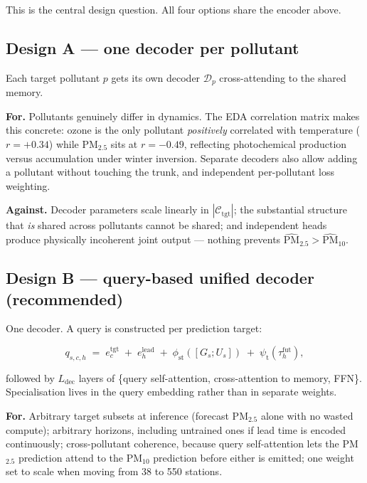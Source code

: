 \documentclass[11pt,a4paper]{article}
\newcommand{\Cset}{\mathcal{C}}
\begin{document}
This is the central design question. All four options share the encoder above.

\subsection{Design A --- one decoder per pollutant}

Each target pollutant $p$ gets its own decoder $\mathcal{D}_p$ cross-attending to
the shared memory.

\textbf{For.} Pollutants genuinely differ in dynamics. The EDA correlation matrix
makes this concrete: ozone is the only pollutant \emph{positively} correlated
with temperature ($r=+0.34$) while PM$_{2.5}$ sits at $r=-0.49$, reflecting
photochemical production versus accumulation under winter inversion. Separate
decoders also allow adding a pollutant without touching the trunk, and
independent per-pollutant loss weighting.

\textbf{Against.} Decoder parameters scale linearly in $|\Cset_{\text{tgt}}|$; the
substantial structure that \emph{is} shared across pollutants cannot be shared;
and independent heads produce physically incoherent joint output --- nothing
prevents $\widehat{\text{PM}}_{2.5} > \widehat{\text{PM}}_{10}$.

\subsection{Design B --- query-based unified decoder (recommended)}

One decoder. A query is constructed per prediction target:

\begin{equation}
q_{s,c,h} \;=\; e^{\text{tgt}}_{c} \;+\; e^{\text{lead}}_{h} \;+\; \phi_{\text{st}}\!\left([G_s;U_s]\right) \;+\; \psi_{\text{t}}\!\left(\tau^{\text{fut}}_{h}\right),
\end{equation}

followed by $L_{\text{dec}}$ layers of \{query self-attention, cross-attention to
memory, FFN\}. Specialisation lives in the query embedding rather than in
separate weights.

\textbf{For.} Arbitrary target subsets at inference (forecast PM$_{2.5}$ alone
with no wasted compute); arbitrary horizons, including untrained ones if lead
time is encoded continuously; cross-pollutant coherence, because query
self-attention lets the PM$_{2.5}$ prediction attend to the PM$_{10}$
prediction before either is emitted; one weight set to scale when moving from 38
to 550 stations.
\end{document}
